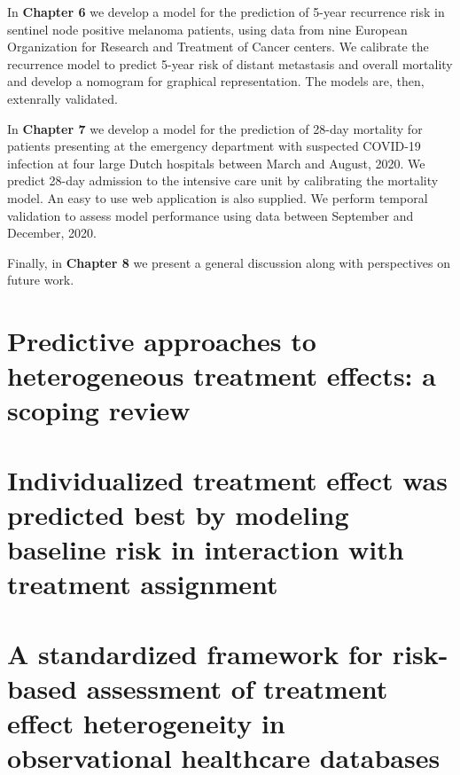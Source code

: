 \documentclass[
]{book}
\begin{document}
In \textbf{Chapter 6} we develop a model for the prediction of 5-year recurrence risk
in sentinel node positive melanoma patients, using data from nine European
Organization for Research and Treatment of Cancer centers. We calibrate the
recurrence model to predict 5-year risk of distant metastasis and overall
mortality and develop a nomogram for graphical representation. The models are,
then, extenrally validated.

In \textbf{Chapter 7} we develop a model for the prediction of 28-day mortality for
patients presenting at the emergency department with suspected COVID-19
infection at four large Dutch hospitals between March and August, 2020. We
predict 28-day admission to the intensive care unit by calibrating the mortality
model. An easy to use web application is also supplied. We perform temporal
validation to assess model performance using data between September and
December, 2020.

Finally, in \textbf{Chapter 8} we present a general discussion along with perspectives on
future work.

\hypertarget{predictive-approaches-to-heterogeneous-treatment-effects-a-scoping-review}{%
\chapter{Predictive approaches to heterogeneous treatment effects: a scoping review}\label{predictive-approaches-to-heterogeneous-treatment-effects-a-scoping-review}}

\vspace*{\fill}\par
\pagebreak

\hypertarget{individualized-treatment-effect-was-predicted-best-by-modeling-baseline-risk-in-interaction-with-treatment-assignment}{%
\chapter{Individualized treatment effect was predicted best by modeling baseline risk in interaction with treatment assignment}\label{individualized-treatment-effect-was-predicted-best-by-modeling-baseline-risk-in-interaction-with-treatment-assignment}}

\vspace*{\fill}\par
\pagebreak

\hypertarget{a-standardized-framework-for-risk-based-assessment-of-treatment-effect-heterogeneity-in-observational-healthcare-databases}{%
\chapter{A standardized framework for risk-based assessment of treatment effect heterogeneity in observational healthcare databases}\label{a-standardized-framework-for-risk-based-assessment-of-treatment-effect-heterogeneity-in-observational-healthcare-databases}}
\end{document}
